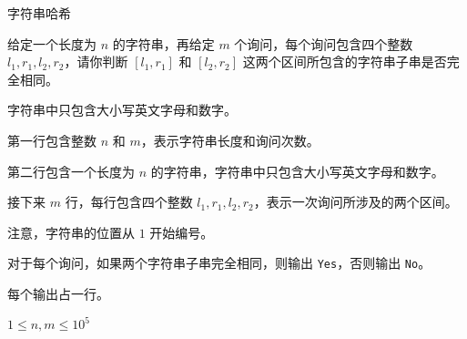 字符串哈希

给定一个长度为 $n$ 的字符串，再给定 $m$ 个询问，每个询问包含四个整数 $l_1, r_1, l_2, r_2$，请你判断 $[l_1, r_1]$ 和 $[l_2, r_2]$ 这两个区间所包含的字符串子串是否完全相同。

字符串中只包含大小写英文字母和数字。

第一行包含整数 $n$ 和 $m$，表示字符串长度和询问次数。

第二行包含一个长度为 $n$ 的字符串，字符串中只包含大小写英文字母和数字。

接下来 $m$ 行，每行包含四个整数 $l_1, r_1, l_2, r_2$，表示一次询问所涉及的两个区间。

注意，字符串的位置从 $1$ 开始编号。

对于每个询问，如果两个字符串子串完全相同，则输出 \texttt{Yes}，否则输出 \texttt{No}。

每个输出占一行。

$1 \le n, m \le 10^5$